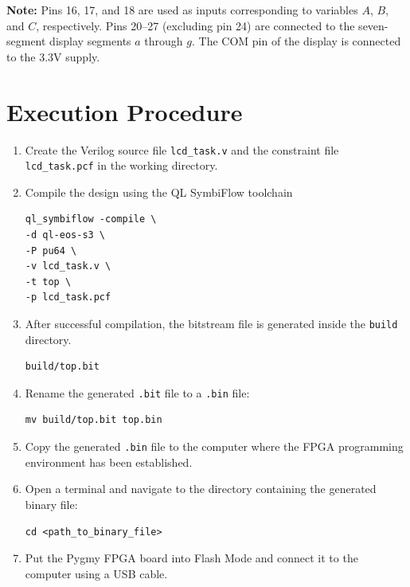 \documentclass[12pt,a4paper]{article}
\begin{document}
\textbf{Note:} Pins 16, 17, and 18 are used as inputs corresponding to variables \(A\), \(B\), and \(C\), respectively. Pins 20--27 (excluding pin 24) are connected to the seven-segment display segments \(a\) through \(g\). The COM pin of the display is connected to the 3.3V supply.
\section*{Execution Procedure}

\begin{enumerate}

\item Create the Verilog source file \texttt{lcd_task.v} and the constraint file \texttt{lcd_task.pcf} in the working directory.

\item Compile the design using the QL SymbiFlow toolchain

\begin{verbatim}
ql_symbiflow -compile \
-d ql-eos-s3 \
-P pu64 \
-v lcd_task.v \
-t top \
-p lcd_task.pcf
\end{verbatim}

\item After successful compilation, the bitstream file is generated inside the \texttt{build} directory.

\begin{verbatim}
build/top.bit
\end{verbatim}

\item Rename the generated \texttt{.bit} file to a \texttt{.bin} file:

\begin{verbatim}
mv build/top.bit top.bin
\end{verbatim}

\item Copy the generated \texttt{.bin} file to the computer where the FPGA programming environment has been established.

\item Open a terminal and navigate to the directory containing the generated binary file:

\begin{verbatim}
cd <path_to_binary_file>
\end{verbatim}

\item Put the Pygmy FPGA board into Flash Mode and connect it to the computer using a USB cable.


\end{enumerate}
\end{document}

